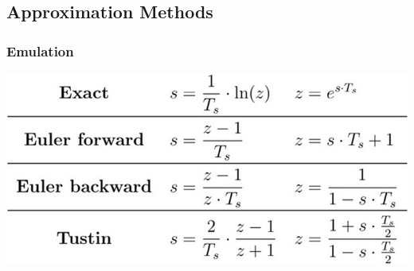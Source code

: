 \subsection{Approximation Methods}
    \subsubsection{Emulation}
        \centerline{\includegraphics[width=0.8\linewidth]{src/1_discrete_time/images/emulation.jpeg}}